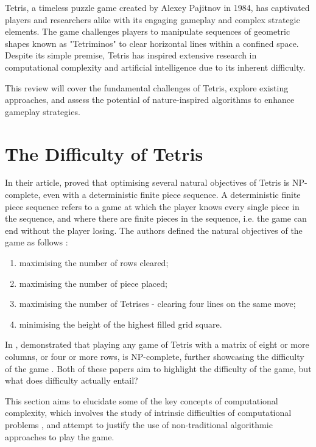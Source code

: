 \documentclass[a4paper, 12pt]{extreport}
\begin{document}
		Tetris, a timeless puzzle game created by Alexey Pajitnov in 1984, has captivated players and researchers alike with its engaging gameplay and complex strategic elements. The game challenges players to manipulate sequences of geometric shapes known as "Tetriminos" to clear horizontal lines within a confined space. Despite its simple premise, Tetris has inspired extensive research in computational complexity and artificial intelligence due to its inherent difficulty.
		
		This review will cover the fundamental challenges of Tetris, explore existing approaches, and assess the potential of nature-inspired algorithms to enhance gameplay strategies.	
				
		\section{The Difficulty of Tetris} \label{sec:diff-of-tetris}
		
			In their article, \citeauthor{tetris-is-hard-even-to-approx} \cite{tetris-is-hard-even-to-approx} proved that optimising several natural objectives of Tetris is NP-complete, even with a deterministic finite piece sequence. A deterministic finite piece sequence refers to a game at which the player knows every single piece in the sequence, and where there are finite pieces in the sequence, i.e. the game can end without the player losing. The authors defined the natural objectives of the game as follows \cite{tetris-is-hard-even-to-approx}:
			
			\begin{enumerate}
				\item maximising the number of rows cleared;
				\item maximising the number of piece placed;
				\item maximising the number of Tetrises - clearing four lines on the same move;
				\item minimising the height of the highest filled grid square.
			\end{enumerate}
			
			In \citeyear{tetris-o1-np-hard}, \citeauthor{tetris-o1-np-hard} \cite{tetris-o1-np-hard} demonstrated that playing any game of Tetris with a matrix of eight or more columns, or four or more rows, is NP-complete, further showcasing the difficulty of the game . Both of these papers aim to highlight the difficulty of the game, but what does difficulty actually entail?
			
			This section aims to elucidate some of the key concepts of computational complexity, which involves the study of intrinsic difficulties of computational problems \cite{cc:conceptual-perspective}, and attempt to justify the use of non-traditional algorithmic approaches to play the game.
			
\end{document}
